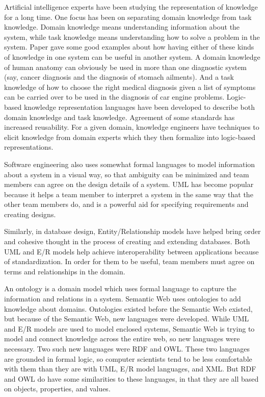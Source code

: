 \documentclass[10pt,journal,compsoc]{IEEEtran}
\begin{document}
Artificial intelligence experts have been studying the representation  of knowledge for a long time.  One focus has been on separating domain knowledge from task knowledge.  Domain knowledge means understanding information about the system, while task knowledge means understanding how to solve a problem in the system.  Paper \cite{_social_2007} gave some good examples about how having either of these kinds of knowledge in one system can be useful in another system.  A domain knowledge of human anatomy can obviously be used in more than one diagnostic system (say, cancer diagnosis and the diagnosis of stomach ailments).  And a task knowledge of how to choose the right medical diagnosis given a list of symptoms can be carried over to be used in the diagnosis of car engine problems.  Logic-based knowledge representation languages have been developed to describe both domain knowledge and task knowledge.  Agreement of some standards has increased reusability.  For a given domain, knowledge engineers have techniques to elicit knowledge from domain experts which they then formalize into logic-based representations.  

Software engineering also uses somewhat formal languages to model information about a system in a visual way, so that ambiguity can be minimized and team members can agree on the design details of a system.  UML  has become popular because it helps a team member to interpret a system in the same way that the other team members do, and is a powerful aid for specifying requirements and creating designs.  

Similarly, in database design, Entity/Relationship models have helped bring order and cohesive thought in the process of creating and extending databases.   Both UML and E/R models help achieve interoperability between applications because of standardization.  In order for them to be useful, team members must agree on terms and relationships in the domain.  

An ontology is a domain model which uses formal language to capture the information and relations in a system.   Semantic Web uses ontologies to add knowledge about domains.  Ontologies existed before the Semantic Web existed, but because of the Semantic Web, new languages were developed.  While UML and E/R models are used to model enclosed systems, Semantic Web is trying to model and connect knowledge across the entire web, so new languages were necessary.  Two such new languages were RDF and OWL.  These two languages are grounded in formal logic, so computer scientists tend to be less comfortable with them than they are with UML, E/R model languages, and XML.  But RDF and OWL do have some similarities to these languages, in that they are all based on objects, properties, and values.
\end{document}
